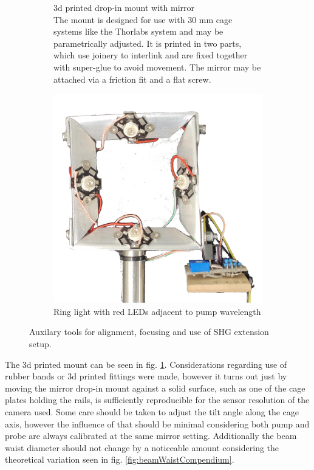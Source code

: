\documentclass[twoside,openright]{scrreprt}
\begin{document}
\begin{figure}[hbtp]
\begin{subfigure}[t]{0.66\textwidth}
\begin{subfigure}[t]{0.45\columnwidth}
\end{subfigure}
\caption{3d printed drop-in mount with mirror\\
The mount is designed for use with 30 mm cage systems like the Thorlabs system and may be parametrically adjusted.
It is printed in two parts, which use joinery to interlink and are fixed together with super-glue to avoid movement.
The mirror may be attached via a friction fit and a flat screw.\label{fig:drop-in-Mirror-mount}}
\end{subfigure}
\hfill
\centering
\begin{subfigure}[t]{0.3\textwidth}
\centering
\includegraphics[width=\columnwidth]{images/TAM/RingLightFrontFree.png}
\caption{Ring light with red LEDs adjacent to pump wavelength}
\end{subfigure}
\caption{Auxilary tools for alignment, focusing and use of SHG extension setup.}
\end{figure}


The 3d printed mount can be seen in fig. \ref{fig:drop-in-Mirror-mount}.
Considerations regarding use of rubber bands or 3d printed fittings were made, however it turns out just by moving the mirror drop-in mount against a solid surface, such as one of the cage plates holding the rails, is sufficiently reproducible for the sensor resolution of the camera used. Some care should be taken to adjust the tilt angle along the cage axis, however the influence of that should be minimal considering both pump and probe are always calibrated at the same mirror setting. Additionally the beam waist diameter should not change by a noticeable amount considering the theoretical variation seen in fig. \ref{fig:beamWaistCompendium}.\\
\end{document}
